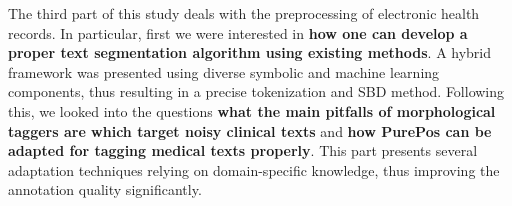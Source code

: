 The third part of this study deals with the preprocessing of electronic health records.
In particular, first we were interested in \textbf{how one can develop a proper text segmentation algorithm using existing methods}. 
A hybrid framework was presented using diverse symbolic and machine learning components, thus resulting in a precise tokenization and SBD method.
Following this, we looked into the questions \textbf{what the main pitfalls of morphological taggers are which target noisy clinical texts} and \textbf{how PurePos can be adapted for tagging medical texts properly}.
This part presents several adaptation techniques relying on domain-specific knowledge, thus improving the annotation quality significantly.

